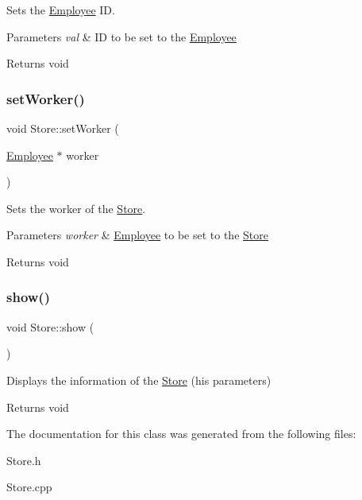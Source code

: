 Sets the \hyperlink{class_employee}{Employee} ID. 


\begin{DoxyParams}{Parameters}
{\em val} & ID to be set to the \hyperlink{class_employee}{Employee}\\
\hline
\end{DoxyParams}
\begin{DoxyReturn}{Returns}
void 
\end{DoxyReturn}
\mbox{\label{class_store_a5486a87318c219a4cc85438c9b171ffc}} 
\subsubsection{\texorpdfstring{set\+Worker()}{setWorker()}}
{\footnotesize\ttfamily void Store\+::set\+Worker (\begin{DoxyParamCaption}\item[{\hyperlink{class_employee}{Employee} $\ast$}]{worker }\end{DoxyParamCaption})}



Sets the worker of the \hyperlink{class_store}{Store}. 


\begin{DoxyParams}{Parameters}
{\em worker} & \hyperlink{class_employee}{Employee} to be set to the \hyperlink{class_store}{Store}\\
\hline
\end{DoxyParams}
\begin{DoxyReturn}{Returns}
void 
\end{DoxyReturn}
\mbox{\label{class_store_a7c3951daba9c6f0c3c432aea46cfd5b8}} 
\subsubsection{\texorpdfstring{show()}{show()}}
{\footnotesize\ttfamily void Store\+::show (\begin{DoxyParamCaption}{ }\end{DoxyParamCaption})}



Displays the information of the \hyperlink{class_store}{Store} (his parameters) 

\begin{DoxyReturn}{Returns}
void 
\end{DoxyReturn}


The documentation for this class was generated from the following files\+:\begin{DoxyCompactItemize}
\item 
Store.\+h\item 
Store.\+cpp\end{DoxyCompactItemize}
